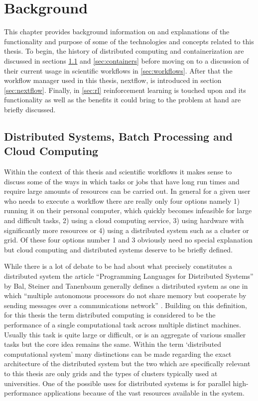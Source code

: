 
\cleardoublepage
\chapter{Background}
\label{cha:background}


This chapter provides background information on and explanations of the functionality and purpose of some of the technologies and concepts related to this thesis.  To begin, the history of distributed computing and containerization are discussed in sections \ref{sec:dist-computing} and \ref{sec:containers} before moving on to a discussion of their current usage in scientific workflows in \ref{sec:workflows}. After that the workflow manager used in this thesis, nextflow, is introduced in section \ref{sec:nextflow}. Finally, in \ref{sec:rl} reinforcement learning is touched upon and its functionality as well as the benefits it could bring to the problem at hand are briefly discussed.

\section{Distributed Systems, Batch Processing and Cloud Computing}
\label{sec:dist-computing}

Within the context of this thesis and scientific workflows it makes sense to discuss some of the ways in which tasks or jobs that have long run times and require large amounts of resources can be carried out. In general for a given user who needs to execute a workflow there are really only four options namely 1) running it on their personal computer, which quickly becomes infeasible for large and difficult tasks, 2) using a cloud computing service, 3) using hardware with significantly more resources or 4) using a distributed system such as a cluster or grid. Of these four options number 1 and 3 obviously need no special explanation but cloud computing and distributed systems deserve to be briefly defined.

While there is a lot of debate to be had about what precisely constitutes a distributed system the article “Programming Languages for Distributed Systems” by Bal, Steiner and Tanenbaum generally defines a distributed system as one in which “multiple autonomous processors do not share memory but cooperate by sending messages over a communications network” \cite{Tanenbaum} . Building on this definition, for this thesis the term distributed computing is considered to be the performance of a single computational task across multiple distinct machines. Usually this task is quite large or difficult, or is an aggregate of various smaller tasks but the core idea remains the same. Within the term ‘distributed computational system’ many distinctions can be made regarding the exact architecture of the distributed system but the two which are specifically relevant to this thesis are only grids and the types of clusters typically used at universities.  One of the possible uses for distributed systems is for parallel high-performance applications because of the vast resources available in the system.

